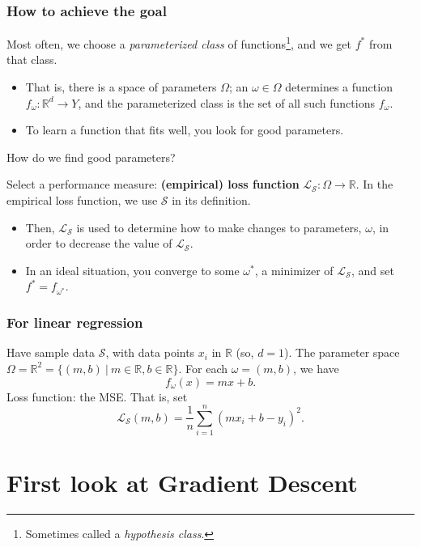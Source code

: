\documentclass{beamer}
\theoremstyle{example}
\begin{document}
\begin{frame}
\frametitle{How to achieve the goal}
Most often, we choose a \textit{parameterized class} of functions\footnote{Sometimes called a \textit{hypothesis class}.}, and we get $f^*$ from that class. 
\pause
\begin{itemize}
    \item That is, there is a space of parameters $\Omega$; an $\omega\in\Omega$ determines a function $f_{\omega}:\mathbb R^d \to Y$, and the parameterized class is the set of all such functions $f_\omega$. %
    \pause
    \item To learn a function that fits well, you look for good parameters.
\end{itemize}

\pause
How do we find good parameters?

Select a performance measure: \textbf{(empirical) loss function} $\mathcal L_{\mathcal S}:\Omega \to \mathbb R$. In the empirical loss function, we use $\mathcal S$ in its definition.
\pause
\begin{itemize}
    \pause
    \item Then, $\mathcal L_{\mathcal S}$ is used to determine how to make changes to parameters, $\omega$, in order to decrease the value of $\mathcal L_{\mathcal S}$.
    \pause
    \item In an ideal situation, you converge to some $\omega^*$, a minimizer of $\mathcal L_{\mathcal S}$, and set $f^* = f_{\omega^*}$.
\end{itemize}

\end{frame}

\begin{frame}
    \frametitle{For linear regression}
    Have sample data $\mathcal S$, with data points $x_i$ in $\mathbb R$ (so, $d=1$). The parameter space $\Omega = \mathbb R^2 = \{(m,b)\ |\ m\in\mathbb R, b\in\mathbb R\}$. For each $\omega = (m,b)$, we have
        \[f_{\omega}(x) = mx + b.\]
    \pause
    Loss function: the MSE. That is, set 
        \[\mathcal L_{\mathcal S}(m,b) = \frac1{n}\sum_{i=1}^n (mx_i + b - y_i)^2.\]
\end{frame}

\section{First look at Gradient Descent}
\end{document}
